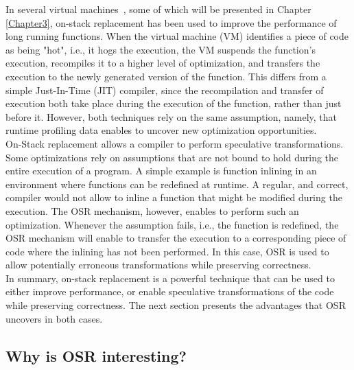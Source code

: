 In several virtual machines~\cite{paleczny2001java, lameed2013modular, holzle1992debugging, fink2003design, soman2006efficient, duboscq2014speculation, OSRKit, WebKitFTL}, some of which will be presented in Chapter \ref{Chapter3}, on-stack replacement has been used to improve the performance of long running functions.
When the virtual machine (VM) identifies a piece of code as being "hot", i.e., it hogs the execution, the VM suspends the function's execution, recompiles it to a higher level of optimization, and transfers the execution to the newly generated version of the function.
This differs from a simple Just-In-Time (JIT) compiler, since the recompilation and transfer of execution both take place during the execution of the function, rather than just before it.
However, both techniques rely on the same assumption, namely, that runtime profiling data enables to uncover new optimization opportunities.\\

On-Stack replacement allows a compiler to perform speculative transformations.
Some optimizations rely on assumptions that are not bound to hold during the entire execution of a program.
A simple example is function inlining in an environment where functions can be redefined at runtime.
A regular, and correct, compiler would not allow to inline a function that might be modified during the execution.
The OSR mechanism, however, enables to perform such an optimization.
Whenever the assumption fails, i.e., the function is redefined, the OSR mechanism will enable to transfer the execution to a corresponding piece of code where the inlining has not been performed.
In this case, OSR is used to allow potentially erroneous transformations while preserving correctness.\\

In summary, on-stack replacement is a powerful technique that can be used to either improve performance, or enable speculative transformations of the code while preserving correctness.
The next section presents the advantages that OSR uncovers in both cases.

\subsection{Why is OSR interesting?}\label{WhyOSRInteresting}
    
